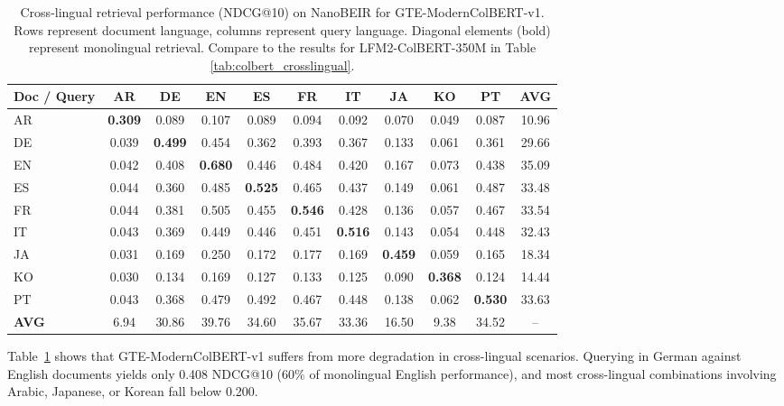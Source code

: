 \documentclass{article}
\begin{document}
\begin{table}[h]
\centering
\footnotesize
\setlength{\tabcolsep}{4pt}
\begin{tabular}{lccccccccc|c}
\toprule
\textbf{Doc / Query} & \textbf{AR} & \textbf{DE} & \textbf{EN} & \textbf{ES} & \textbf{FR} & \textbf{IT} & \textbf{JA} & \textbf{KO} & \textbf{PT} & \textbf{AVG} \\
\midrule
AR & \textbf{0.309} & 0.089 & 0.107 & 0.089 & 0.094 & 0.092 & 0.070 & 0.049 & 0.087 & 10.96 \\
DE & 0.039 & \textbf{0.499} & 0.454 & 0.362 & 0.393 & 0.367 & 0.133 & 0.061 & 0.361 & 29.66 \\
EN & 0.042 & 0.408 & \textbf{0.680} & 0.446 & 0.484 & 0.420 & 0.167 & 0.073 & 0.438 & 35.09 \\
ES & 0.044 & 0.360 & 0.485 & \textbf{0.525} & 0.465 & 0.437 & 0.149 & 0.061 & 0.487 & 33.48 \\
FR & 0.044 & 0.381 & 0.505 & 0.455 & \textbf{0.546} & 0.428 & 0.136 & 0.057 & 0.467 & 33.54 \\
IT & 0.043 & 0.369 & 0.449 & 0.446 & 0.451 & \textbf{0.516} & 0.143 & 0.054 & 0.448 & 32.43 \\
JA & 0.031 & 0.169 & 0.250 & 0.172 & 0.177 & 0.169 & \textbf{0.459} & 0.059 & 0.165 & 18.34 \\
KO & 0.030 & 0.134 & 0.169 & 0.127 & 0.133 & 0.125 & 0.090 & \textbf{0.368} & 0.124 & 14.44 \\
PT & 0.043 & 0.368 & 0.479 & 0.492 & 0.467 & 0.448 & 0.138 & 0.062 & \textbf{0.530} & 33.63 \\
\midrule
\textbf{AVG} & 6.94 & 30.86 & 39.76 & 34.60 & 35.67 & 33.36 & 16.50 & 9.38 & 34.52 & -- \\
\bottomrule
\end{tabular}
\caption{Cross-lingual retrieval performance (NDCG@10) on NanoBEIR for GTE-ModernColBERT-v1. Rows represent document language, columns represent query language. Diagonal elements (bold) represent monolingual retrieval. Compare to the results for LFM2-ColBERT-350M in Table \ref{tab:colbert_crosslingual}.}
\label{tab:gte_colbert_crosslingual}
\end{table}

Table~\ref{tab:gte_colbert_crosslingual} shows that GTE-ModernColBERT-v1 suffers from more degradation in cross-lingual scenarios. Querying in German against English documents yields only 0.408 NDCG@10 (60\% of monolingual English performance), and most cross-lingual combinations involving Arabic, Japanese, or Korean fall below 0.200.
\end{document}
